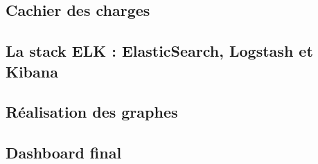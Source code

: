 \subsection{Cachier des charges}
	

\subsection{La stack ELK : ElasticSearch, Logstash et Kibana}
	
	
\subsection{Réalisation des graphes}
	
	
\subsection{Dashboard final}
	